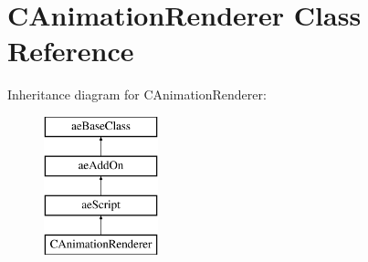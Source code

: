 \hypertarget{class_c_animation_renderer}{}\section{C\+Animation\+Renderer Class Reference}
\label{class_c_animation_renderer}
Inheritance diagram for C\+Animation\+Renderer\+:\begin{figure}[H]
\begin{center}
\leavevmode
\includegraphics[height=4.000000cm]{class_c_animation_renderer}
\end{center}
\end{figure}
